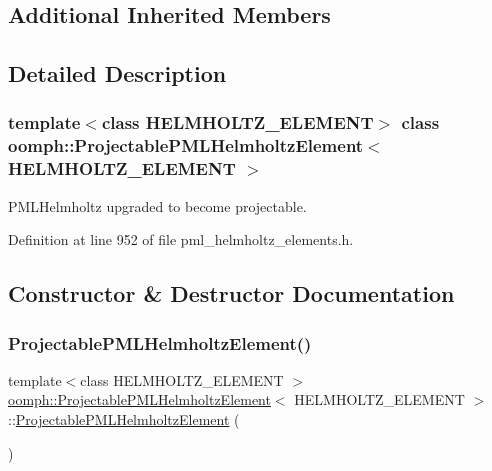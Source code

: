 \subsection*{Additional Inherited Members}


\subsection{Detailed Description}
\subsubsection*{template$<$class H\+E\+L\+M\+H\+O\+L\+T\+Z\+\_\+\+E\+L\+E\+M\+E\+NT$>$\newline
class oomph\+::\+Projectable\+P\+M\+L\+Helmholtz\+Element$<$ H\+E\+L\+M\+H\+O\+L\+T\+Z\+\_\+\+E\+L\+E\+M\+E\+N\+T $>$}

P\+M\+L\+Helmholtz upgraded to become projectable. 

Definition at line 952 of file pml\+\_\+helmholtz\+\_\+elements.\+h.



\subsection{Constructor \& Destructor Documentation}
\mbox{\label{classoomph_1_1ProjectablePMLHelmholtzElement_a005f750d15074893d3ac428b49f2318d}} 
\subsubsection{\texorpdfstring{Projectable\+P\+M\+L\+Helmholtz\+Element()}{ProjectablePMLHelmholtzElement()}}
{\footnotesize\ttfamily template$<$class H\+E\+L\+M\+H\+O\+L\+T\+Z\+\_\+\+E\+L\+E\+M\+E\+NT $>$ \\
\hyperlink{classoomph_1_1ProjectablePMLHelmholtzElement}{oomph\+::\+Projectable\+P\+M\+L\+Helmholtz\+Element}$<$ H\+E\+L\+M\+H\+O\+L\+T\+Z\+\_\+\+E\+L\+E\+M\+E\+NT $>$\+::\hyperlink{classoomph_1_1ProjectablePMLHelmholtzElement}{Projectable\+P\+M\+L\+Helmholtz\+Element} (\begin{DoxyParamCaption}{ }\end{DoxyParamCaption})\hspace{0.3cm}{\ttfamily [inline]}}



